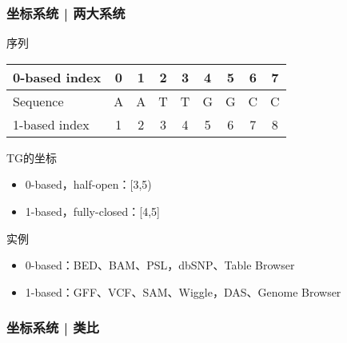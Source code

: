 \begin{frame}
  \frametitle{坐标系统 | \alert{两大系统}}
  \begin{block}{序列}
  \begin{table}
    \centering
    \begin{tabular}{lcccccccc}
      \hline
      0-based index & 0 & 1 & 2 & 3 & 4 & 5 & 6 & 7\\
      \hline
      Sequence & A & A & T & T & G & G & C & C\\
      \hline
      1-based index & 1 & 2 & 3 & 4 & 5 & 6 & 7 & 8\\
      \hline
    \end{tabular}
  \end{table}
  \end{block}
  \pause
  \begin{block}{TG的坐标}
    \begin{itemize}
      \item 0-based，half-open：[3,5)
      \item 1-based，fully-closed：[4,5]
    \end{itemize}
  \end{block}
  \pause
  \begin{block}{实例}
    \begin{itemize}
      \item 0-based：BED、BAM、PSL，dbSNP、Table Browser
      \item 1-based：GFF、VCF、SAM、Wiggle，DAS、Genome Browser
    \end{itemize}
  \end{block}
\end{frame}

\begin{frame}
  \frametitle{坐标系统 | 类比}
  \begin{columns}
  \end{columns}
\end{frame}

